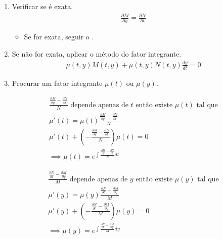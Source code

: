 \documentclass{article}
\begin{document}
\begin{enumerate}
    \item Verificar se é exata.
    \begin{gather*}
    \frac{\partial M}{\partial y} = \frac{\partial N}{\partial t}
    \end{gather*}
    
    \begin{itemize}
        \item Se for exata, seguir o .
    \end{itemize}
    
    \item Se não for exata, aplicar o método do fator integrante.
    \begin{gather*}
    \mu(t,y) M(t,y) + \mu(t,y) N(t,y) \frac{dy}{dt} = 0
    \end{gather*}

    \item Procurar um fator integrante $\mu(t)$ ou $\mu(y)$.

    \begin{gather*}
    \frac{\frac{\partial M}{\partial y} - \frac{\partial N}{\partial t}}{N} \text{ depende apenas de } t \text{ então existe } \mu(t) \text{ tal que} \\
    \mu'(t) = \mu(t) \frac{\frac{\partial M}{\partial y} - \frac{\partial N}{\partial t}}{N} \\
    \mu'(t) + \left( - \frac{\frac{\partial M}{\partial y} - \frac{\partial N}{\partial t}}{N} \right) \mu(t) = 0 \\
    \implies \mu(t) = e^{\int \frac{\frac{\partial M}{\partial y} - \frac{\partial N}{\partial t}}{N} dt}
    \end{gather*}

    \begin{gather*}
    \frac{\frac{\partial N}{\partial t} - \frac{\partial M}{\partial y}}{M} \text{ depende apenas de } y \text{ então existe } \mu(y) \text{ tal que} \\
    \mu'(y) = \mu(y) \frac{\frac{\partial N}{\partial t} - \frac{\partial M}{\partial y}}{M} \\
    \mu'(y) + \left( - \frac{\frac{\partial N}{\partial t} - \frac{\partial M}{\partial y}}{M} \right) \mu(y) = 0 \\
    \implies \mu(y) = e^{\int \frac{\frac{\partial N}{\partial t} - \frac{\partial M}{\partial y}}{M} dy}
    \end{gather*}


\end{enumerate}
\end{document}
